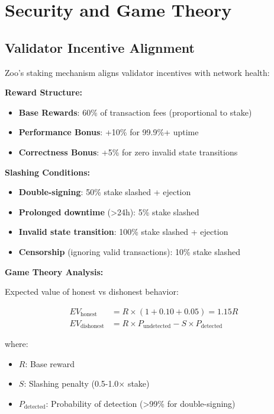 \section{Security and Game Theory}


\subsection{Validator Incentive Alignment}

Zoo's staking mechanism aligns validator incentives with network health:

\textbf{Reward Structure:}
\begin{itemize}
\item \textbf{Base Rewards}: 60\% of transaction fees (proportional to stake)
\item \textbf{Performance Bonus}: +10\% for 99.9\%+ uptime
\item \textbf{Correctness Bonus}: +5\% for zero invalid state transitions
\end{itemize}

\textbf{Slashing Conditions:}
\begin{itemize}
\item \textbf{Double-signing}: 50\% stake slashed + ejection
\item \textbf{Prolonged downtime} (>24h): 5\% stake slashed
\item \textbf{Invalid state transition}: 100\% stake slashed + ejection
\item \textbf{Censorship} (ignoring valid transactions): 10\% stake slashed
\end{itemize}

\textbf{Game Theory Analysis:}

Expected value of honest vs dishonest behavior:

\begin{align}
EV_{\text{honest}} &= R \times (1 + 0.10 + 0.05) = 1.15R \\
EV_{\text{dishonest}} &= R \times P_{\text{undetected}} - S \times P_{\text{detected}}
\end{align}

where:
\begin{itemize}
\item $R$: Base reward
\item $S$: Slashing penalty (0.5-1.0× stake)
\item $P_{\text{detected}}$: Probability of detection (>99\% for double-signing)
\end{itemize}

